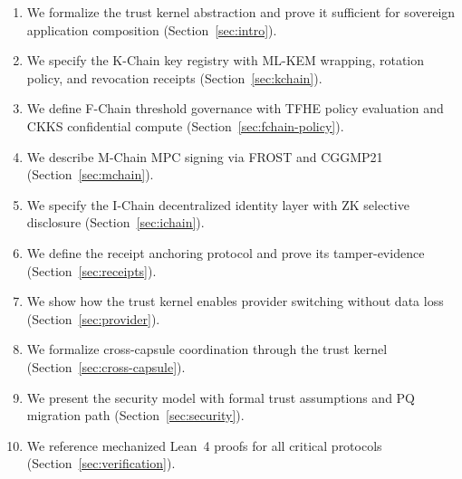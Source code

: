 \begin{enumerate}
    \item We formalize the trust kernel abstraction and prove it sufficient for
          sovereign application composition (Section~\ref{sec:intro}).
    \item We specify the K-Chain key registry with ML-KEM wrapping, rotation
          policy, and revocation receipts (Section~\ref{sec:kchain}).
    \item We define F-Chain threshold governance with TFHE policy evaluation and
          CKKS confidential compute (Section~\ref{sec:fchain-policy}).
    \item We describe M-Chain MPC signing via FROST and CGGMP21
          (Section~\ref{sec:mchain}).
    \item We specify the I-Chain decentralized identity layer with ZK selective
          disclosure (Section~\ref{sec:ichain}).
    \item We define the receipt anchoring protocol and prove its
          tamper-evidence (Section~\ref{sec:receipts}).
    \item We show how the trust kernel enables provider switching without data
          loss (Section~\ref{sec:provider}).
    \item We formalize cross-capsule coordination through the trust kernel
          (Section~\ref{sec:cross-capsule}).
    \item We present the security model with formal trust assumptions and PQ
          migration path (Section~\ref{sec:security}).
    \item We reference mechanized Lean~4 proofs for all critical protocols
          (Section~\ref{sec:verification}).
\end{enumerate}

